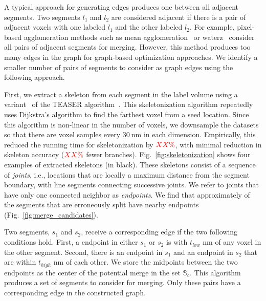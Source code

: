 A typical approach for generating edges produces one between all adjacent segments. 
Two segments $l_1$ and $l_2$ are considered adjacent if there is a pair of adjacent voxels with one labeled $l_1$ and the other labeled $l_2$.
For example, pixel-based agglomeration methods such as mean agglomeration~\cite{lee2017superhuman} or waterz~\cite{funke2017deep} consider all pairs of adjacent segments for merging.
However, this method produces too many edges in the graph for graph-based optimization approaches. 
We identify a smaller number of pairs of segments to consider as graph edges using the following approach.

First, we extract a skeleton from each segment in the label volume using a variant~\cite{zhao2014automatic} of the TEASER algorithm~\cite{sato2000teasar}. 
This skeletonization algorithm repeatedly uses Dijkstra's algorithm to find the farthest voxel from a seed location. 
Since this algorithm is non-linear in the number of voxels, we downsample the datasets so that there are voxel samples every $\SI{30}{\nano\meter}$ in each dimension.
Empirically, this reduced the running time for skeletonization by $\textcolor{red}{XX\%}$, with minimal reduction in skeleton accuracy ($\textcolor{red}{XX\%}$ fewer branches). 
Fig.~\ref{fig:skeletonization} shows four examples of extracted skeletons (in black). 
These skeletons consist of a sequence of \textit{joints}, i.e., locations that are locally a maximum distance from the segment boundary, with line segments connecting successive joints. 
We refer to joints that have only one connected neighbor as \textit{endpoints}. 
We find that approximately  of the segments that are erroneously split have nearby endpoints (Fig.~\ref{fig:merge_candidates}). 

Two segments, $s_1$ and $s_2$, receive a corresponding edge if the two following conditions hold.
First, a endpoint in either $s_1$ or $s_2$ is with $t_{low}$ nm of any voxel in the other segment.
Second, there is an endpoint in $s_1$ and an endpoint in $s_2$ that are within $t_{high}$ nm of each other.
We store the midpoints between the two endpoints as the center of the potential merge in the set $\mathbb{S}_c$. 
This algorithm produces a set of segments to consider for merging. 
Only these pairs have a corresponding edge in the constructed graph.


